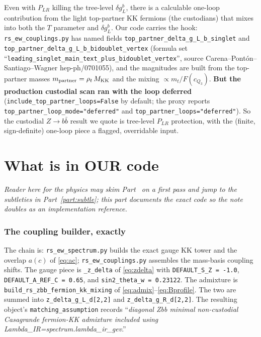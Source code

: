 \documentclass[11pt]{article}
\newcommand{\MKK}{M_{\mathrm{KK}}}
\newcommand{\PLR}{P_{LR}}
\newcommand{\code}[1]{\texttt{#1}}
\newcommand{\dgL}{\delta g_L^b}
\theoremstyle{definition}
\begin{document}
Even with $\PLR$ killing the tree-level $\dgL$, there is a calculable one-loop
contribution from the light top-partner KK fermions (the custodians) that mixes
into both the $T$ parameter and $\dgL$. Our code carries the hook:
\code{rs\_ew\_couplings.py} has named fields
\code{top\_partner\_delta\_g\_L\_b\_singlet} and
\code{top\_partner\_delta\_g\_L\_b\_bidoublet\_vertex} (formula set
``\code{leading\_singlet\_main\_text\_plus\_bidoublet\_vertex}'', source
Carena--Pont\'on--Santiago--Wagner hep-ph/0701055), and the magnitudes are
built from the top-partner masses $m_{\rm partner}=\rho_t\,\MKK$ and the mixing
$\propto m_t/F(c_{Q_3})$. \textbf{But the production custodial scan ran with the
loop deferred} (\code{include\_top\_partner\_loops=False} by default; the proxy
reports \code{top\_partner\_loop\_mode="deferred"} and
\code{top\_partner\_loops="deferred"}). So the custodial $Z\to b\bar b$ result we
quote is tree-level $\PLR$ protection, with the (finite, sign-definite) one-loop
piece a flagged, overridable input.

\part{What is in OUR code}
\label{part:code}

\emph{Reader here for the physics may skim Part~\ref{part:code} on a first pass
and jump to the subtleties in Part~\ref{part:subtle}; this part documents the
exact code so the note doubles as an implementation reference.}

\section{The coupling builder, exactly}
\label{sec:builder}

The chain is: \code{rs\_ew\_spectrum.py} builds the exact gauge KK tower and the
overlap $a(c)$ of \eqref{eq:ac}; \code{rs\_ew\_couplings.py} assembles the
mass-basis coupling shifts. The gauge piece is \code{\_z\_delta} of
\eqref{eq:zdelta} with \code{DEFAULT\_S\_Z = -1.0}, \code{DEFAULT\_A\_REF\_C =
0.65}, and \code{sin2\_theta\_w = 0.23122}. The admixture is
\code{build\_rs\_zbb\_fermion\_kk\_mixing} of \eqref{eq:admix}--\eqref{eq:Bprofile}.
The two are summed into \code{z\_delta\_g\_L\_d[2,2]} and
\code{z\_delta\_g\_R\_d[2,2]}. The resulting object's \code{matching\_assumption}
records ``\emph{diagonal Zbb minimal non-custodial Casagrande fermion-KK
admixture included using Lambda\_IR=spectrum.lambda\_ir\_gev}.''
\end{document}

